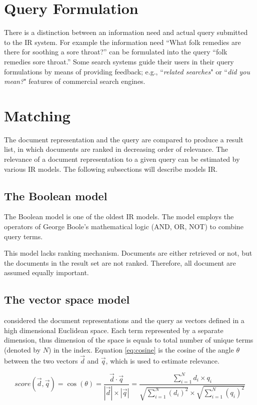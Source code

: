 \section{Query Formulation}
There is a distinction between an information need and actual query submitted to the IR system.
For example the information need ``What folk remedies are there for soothing a sore throat?'' can be formulated into the query ``folk remedies sore throat.''
Some search systems guide their users in their query formulations by means of providing feedback; e.g., ``\emph{related searches}" or ``\emph{did you mean?}" features of commercial search engines.

\section{Matching}
The document representation and the query are compared to produce a result list, in which documents are ranked in decreasing order of relevance.
The relevance of a document representation to a given query can be estimated by various IR models.
The following subsections will describe models IR.

\subsection{The Boolean model}

The Boolean model is one of the oldest IR models. The model employs the operators of George Boole's mathematical logic (AND, OR, NOT) to combine query terms.

This model lacks ranking mechanism. Documents are either retrieved or not, but the documents in the result set are not ranked.
Therefore, all document are assumed equally important.

\subsection{The vector space model}

\citet*{vectorSpace} considered the document representations and the query as vectors defined in a high dimensional Euclidean space.
Each term represented by a separate dimension, thus dimension of the space is equals to total number of unique terms (denoted by $N$) in the index.
Equation \ref{eq:cosine} is the cosine of the angle $\theta$ between the two vectors $\overrightarrow{d}$ and $\overrightarrow{q}$, which is used to estimate relevance.

\begin{equation} \label{eq:cosine}
score(\overrightarrow{d}, \overrightarrow{q}) = \cos(\theta)
= \frac{\overrightarrow{d} \cdotp  \overrightarrow{q}}{|\overrightarrow{d}| \times  |\overrightarrow{q}|}
= \frac{\sum_{i=1}^{N} d_i \times q_i}{ \sqrt{\sum_{i=1}^{N} (d_i)^2} \times \sqrt{\sum_{i=1}^{N} (q_i)^2}}
\end{equation}

